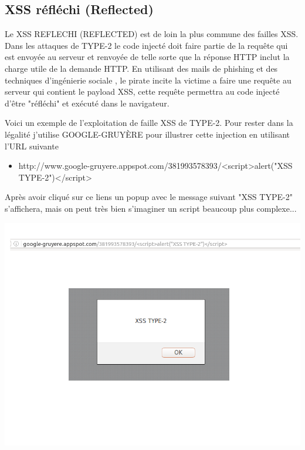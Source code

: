 \bigskip

\subsection{XSS réfléchi (Reflected)}\label{vulnerabilites:web:xss:reflected}

Le XSS REFLECHI (REFLECTED) est de loin la plus commune des failles XSS. Dans les attaques de TYPE-2 le code injecté doit faire partie de la requête qui est envoyée au serveur et renvoyée de telle sorte que la réponse HTTP inclut la charge utile de la demande HTTP. En utilisant des mails de phishing  et des techniques d'ingénierie sociale , le pirate incite la victime a faire une requête au serveur qui contient le payload XSS, cette requête permettra au code injecté d'être "réfléchi" et exécuté dans le navigateur.

\begin{flushleft}
Voici un exemple de l'exploitation de faille XSS de TYPE-2. Pour rester dans la légalité j'utilise GOOGLE-GRUYÈRE pour illustrer cette injection en utilisant l'URL suivante 
\end{flushleft}

\bigskip

\begin{itemize}
\item http://www.google-gruyere.appspot.com/381993578393/<script>alert("XSS TYPE-2")</script>
\end{itemize}

\begin{flushleft}
Après avoir cliqué sur ce liens un popup avec le message suivant "XSS TYPE-2" s'affichera, mais on peut très bien s'imaginer un script beaucoup plus complexe...
\end{flushleft} 

\bigskip

\begin{center}
\includegraphics[scale=0.3]{Web/assets/xsst2.png}
\end{center}

